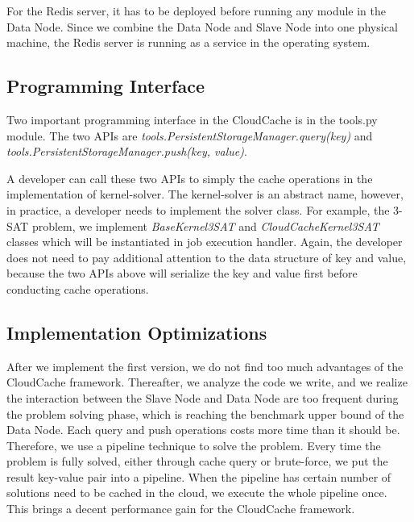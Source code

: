 For the Redis server, it has to be deployed before running any module in the Data Node. Since we combine the Data Node and Slave Node into one physical machine, the Redis server is running as a service in the operating system.

\subsection{Programming Interface}
Two important programming interface in the CloudCache is in the tools.py module. The two APIs are \emph{tools.PersistentStorageManager.query(key)} and \emph{tools.PersistentStorageManager.push(key, value)}. 

A developer can call these two APIs to simply the cache operations in the implementation of kernel-solver. The kernel-solver is an abstract name, however, in practice, a developer needs to implement the solver class. For example, the 3-SAT problem, we implement \emph{BaseKernel3SAT} and \emph{CloudCacheKernel3SAT} classes which will be instantiated in job execution handler. Again, the developer does not need to pay additional attention to the data structure of key and value, because the two APIs above will serialize the key and value first before conducting cache operations.

\subsection{Implementation Optimizations}
After we implement the first version, we do not find too much advantages of the CloudCache framework. Thereafter, we analyze the code we write, and we realize the interaction between the Slave Node and Data Node are too frequent during the problem solving phase, which is reaching the benchmark upper bound of the Data Node. Each query and push operations costs more time than it should be. Therefore, we use a pipeline technique to solve the problem. Every time the problem is fully solved, either through cache query or brute-force, we put the result key-value pair into a pipeline. When the pipeline has certain number of solutions need to be cached in the cloud, we execute the whole pipeline once. This brings a decent performance gain for the CloudCache framework.
